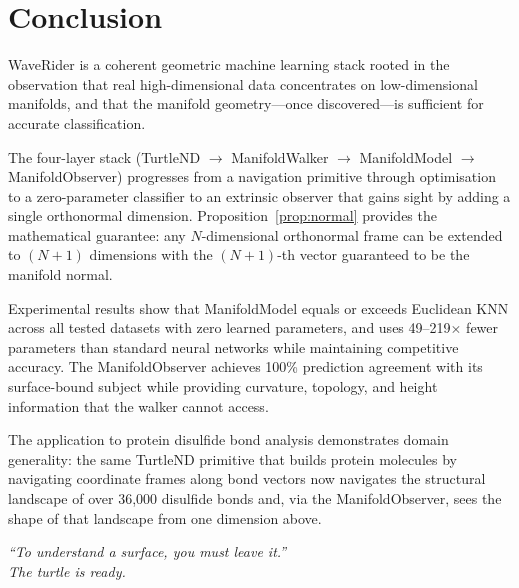 \documentclass[12pt,letterpaper]{article}
\begin{document}
\section{Conclusion}

WaveRider is a coherent geometric machine learning stack rooted in the
observation that real high-dimensional data concentrates on low-dimensional
manifolds, and that the manifold geometry---once discovered---is sufficient for
accurate classification.

The four-layer stack (TurtleND $\to$ ManifoldWalker $\to$ ManifoldModel $\to$
ManifoldObserver) progresses from a navigation primitive through optimisation to
a zero-parameter classifier to an extrinsic observer that gains sight by adding
a single orthonormal dimension.  Proposition~\ref{prop:normal} provides the
mathematical guarantee: any $N$-dimensional orthonormal frame can be extended to
$(N{+}1)$ dimensions with the $(N{+}1)$-th vector guaranteed to be the manifold
normal.

Experimental results show that ManifoldModel equals or exceeds Euclidean KNN
across all tested datasets with zero learned parameters, and uses 49--219$\times$
fewer parameters than standard neural networks while maintaining competitive
accuracy.  The ManifoldObserver achieves 100\% prediction agreement with its
surface-bound subject while providing curvature, topology, and height information
that the walker cannot access.

The application to protein disulfide bond analysis demonstrates domain
generality: the same TurtleND primitive that builds protein molecules by
navigating coordinate frames along bond vectors now navigates the structural
landscape of over 36{,}000 disulfide bonds and, via the ManifoldObserver, sees
the shape of that landscape from one dimension above.

\bigskip
\noindent\textit{``To understand a surface, you must leave it.''\\
The turtle is ready.}
\end{document}
